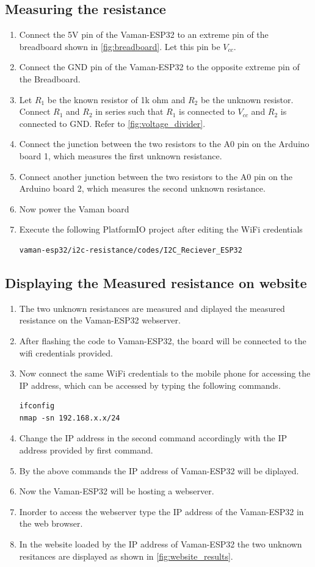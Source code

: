 \subsection{Measuring the resistance}
\begin{enumerate}

\item
Connect the 5V pin of the Vaman-ESP32 to an extreme pin of the breadboard shown 
in \autoref{fig:breadboard}.  Let this pin be $V_{cc}$.
\item
Connect the GND pin of the Vaman-ESP32 to the opposite extreme pin of the 
Breadboard.
\item
Let $R_1$ be the known resistor of 1k ohm and $R_2$ be the unknown resistor. 
Connect $R_1$ and $R_2$ in series such that $R_1$ is connected to $V_{cc}$ and 
$R_2$ is connected to GND. Refer to \autoref{fig:voltage_divider}.
\item
Connect the junction between the two resistors to the A0 pin on the Arduino 
board 1, which measures the first unknown resistance.
\item 
Connect another junction between the two resistors to the A0 pin on the Arduino 
board 2, which measures the second unknown resistance.
\item
Now power the Vaman board
\item
Execute the following PlatformIO project after editing the WiFi credentials
\begin{lstlisting}
vaman-esp32/i2c-resistance/codes/I2C_Reciever_ESP32
\end{lstlisting}
\end{enumerate}
\subsection{Displaying the Measured resistance on website}
\begin{enumerate}
\item The two unknown resistances are measured and diplayed the measured 
resistance on the Vaman-ESP32 webserver.
\item After flashing the code to Vaman-ESP32, the board will be connected to the
wifi credentials provided.
\item Now connect the same WiFi credentials to the mobile phone for accessing 
the IP address, which can be accessed by typing the following commands.
\begin{lstlisting}
ifconfig
nmap -sn 192.168.x.x/24
\end{lstlisting}
\item Change the IP address in the second command accordingly with the IP 
address provided by first command.
\item By the above commands the IP address of Vaman-ESP32 will be diplayed.
\item Now the Vaman-ESP32 will be hosting a webserver.
\item Inorder to access the webserver type the IP address of the Vaman-ESP32 in 
the web browser.
\item In the website loaded by the IP address of Vaman-ESP32 the two unknown 
resitances are displayed as shown in \autoref{fig:website_results}.
\end{enumerate}

